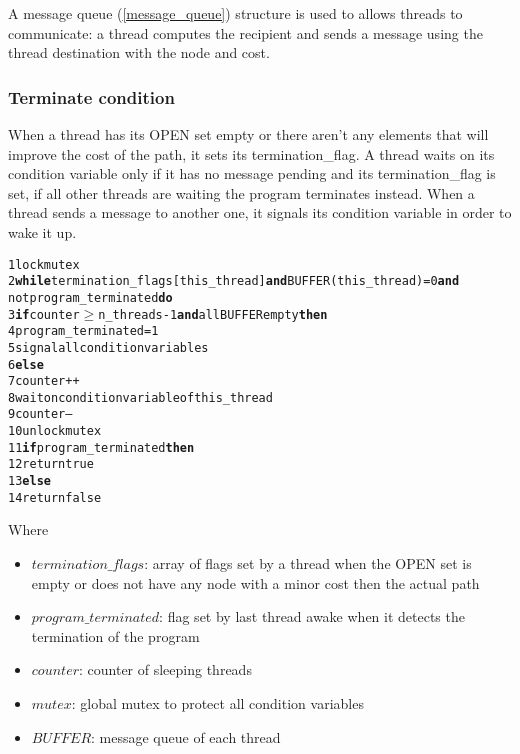 A message queue (\ref{message_queue}) structure is used to allows threads to communicate: a thread computes the recipient and sends a message using the thread destination with the node and cost. 

\subsubsection{Terminate condition}
\label{terminate}

When a thread has its OPEN set empty or there aren't any elements that will improve the cost of the path, it sets its termination\_flag.
A thread waits on its condition variable only if it has no message pending and its termination\_flag is set, if all other threads are waiting the program terminates instead.
When a thread sends a message to another one, it signals its condition variable in order to wake it up.

\begin{alltt}
    1 lock mutex
    2{\bf while} termination_flags[this_thread] {\bf and} BUFFER(this_thread) = 0 {\bf and}
            not program_terminated {\bf do}
    3    {\bf if} counter \( \geq \) n_threads - 1 {\bf and} all BUFFER empty {\bf then}
    4        program_terminated = 1
    5        signal all condition variables
    6    {\bf else}
    7        counter++
    8        wait on condition variable of this_thread
    9        counter--
    10 unlock mutex
    11{\bf if} program_terminated {\bf then}
    12   return true
    13{\bf else}
    14   return false
\end{alltt}

Where
\begin{itemize}
    \item $termination\_flags$: array of flags set by a thread when the OPEN set is empty or does not have any node with a minor cost then the actual path
    \item $program\_terminated$: flag set by last thread awake when it detects the termination of the program
    \item $counter$: counter of sleeping threads
    \item $mutex$: global mutex to protect all condition variables
    \item $BUFFER$: message queue of each thread
\end{itemize}

